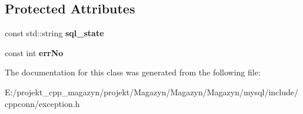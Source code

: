 \subsection*{Protected Attributes}
\begin{DoxyCompactItemize}
\item 
\hypertarget{classsql_1_1_s_q_l_exception_a0c8620ab60af316d2282fbdd112911f2}{}\label{classsql_1_1_s_q_l_exception_a0c8620ab60af316d2282fbdd112911f2} 
const std\+::string {\bfseries sql\+\_\+state}
\item 
\hypertarget{classsql_1_1_s_q_l_exception_ab9c454465e9929c87c090055e88b097b}{}\label{classsql_1_1_s_q_l_exception_ab9c454465e9929c87c090055e88b097b} 
const int {\bfseries err\+No}
\end{DoxyCompactItemize}


The documentation for this class was generated from the following file\+:\begin{DoxyCompactItemize}
\item 
E\+:/projekt\+\_\+cpp\+\_\+magazyn/projekt/\+Magazyn/\+Magazyn/\+Magazyn/mysql/include/cppconn/exception.\+h\end{DoxyCompactItemize}
